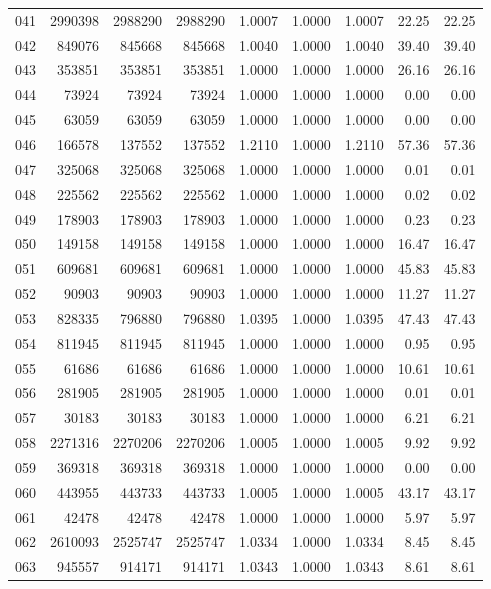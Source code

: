 \begin{longtable}{crrrrrrrr}
041 & 2990398 & 2988290 & 2988290 & 1.0007 & 1.0000 & 1.0007 & 22.25 & 22.25 \\
042 & 849076 & 845668 & 845668 & 1.0040 & 1.0000 & 1.0040 & 39.40 & 39.40 \\
043 & 353851 & 353851 & 353851 & 1.0000 & 1.0000 & 1.0000 & 26.16 & 26.16 \\
044 & 73924 & 73924 & 73924 & 1.0000 & 1.0000 & 1.0000 & 0.00 & 0.00 \\
045 & 63059 & 63059 & 63059 & 1.0000 & 1.0000 & 1.0000 & 0.00 & 0.00 \\
046 & 166578 & 137552 & 137552 & 1.2110 & 1.0000 & 1.2110 & 57.36 & 57.36 \\
047 & 325068 & 325068 & 325068 & 1.0000 & 1.0000 & 1.0000 & 0.01 & 0.01 \\
048 & 225562 & 225562 & 225562 & 1.0000 & 1.0000 & 1.0000 & 0.02 & 0.02 \\
049 & 178903 & 178903 & 178903 & 1.0000 & 1.0000 & 1.0000 & 0.23 & 0.23 \\
050 & 149158 & 149158 & 149158 & 1.0000 & 1.0000 & 1.0000 & 16.47 & 16.47 \\
051 & 609681 & 609681 & 609681 & 1.0000 & 1.0000 & 1.0000 & 45.83 & 45.83 \\
052 & 90903 & 90903 & 90903 & 1.0000 & 1.0000 & 1.0000 & 11.27 & 11.27 \\
053 & 828335 & 796880 & 796880 & 1.0395 & 1.0000 & 1.0395 & 47.43 & 47.43 \\
054 & 811945 & 811945 & 811945 & 1.0000 & 1.0000 & 1.0000 & 0.95 & 0.95 \\
055 & 61686 & 61686 & 61686 & 1.0000 & 1.0000 & 1.0000 & 10.61 & 10.61 \\
056 & 281905 & 281905 & 281905 & 1.0000 & 1.0000 & 1.0000 & 0.01 & 0.01 \\
057 & 30183 & 30183 & 30183 & 1.0000 & 1.0000 & 1.0000 & 6.21 & 6.21 \\
058 & 2271316 & 2270206 & 2270206 & 1.0005 & 1.0000 & 1.0005 & 9.92 & 9.92 \\
059 & 369318 & 369318 & 369318 & 1.0000 & 1.0000 & 1.0000 & 0.00 & 0.00 \\
060 & 443955 & 443733 & 443733 & 1.0005 & 1.0000 & 1.0005 & 43.17 & 43.17 \\
061 & 42478 & 42478 & 42478 & 1.0000 & 1.0000 & 1.0000 & 5.97 & 5.97 \\
062 & 2610093 & 2525747 & 2525747 & 1.0334 & 1.0000 & 1.0334 & 8.45 & 8.45 \\
063 & 945557 & 914171 & 914171 & 1.0343 & 1.0000 & 1.0343 & 8.61 & 8.61 \\

\end{longtable}
